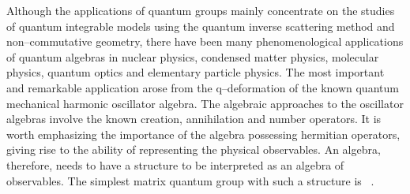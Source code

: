 \documentclass[a4paper,12pt]{article}
\numberwithin{equation}{section}
\begin{document}
Although the applications of quantum groups mainly concentrate on the studies of
 quantum integrable models using the quantum inverse scattering method and
 non--commutative geometry, there have been many phenomenological applications of
 quantum algebras in nuclear physics, condensed matter physics, molecular physics,
 quantum optics and elementary particle physics. The most important and remarkable
 application arose from the q--deformation of the known quantum mechanical harmonic
 oscillator algebra. The algebraic approaches to the oscillator algebras involve the
 known creation, annihilation and number operators. It is worth emphasizing the
 importance of the algebra possessing hermitian operators, giving rise to the ability
 of representing the physical observables. An algebra, therefore, needs to have a
 \myHighlight{$\ast$}\coordHE{} structure to be interpreted as an algebra of observables.
The simplest matrix quantum group with such a structure is \coordHE{}~\cite{Wor}.
\end{document}
